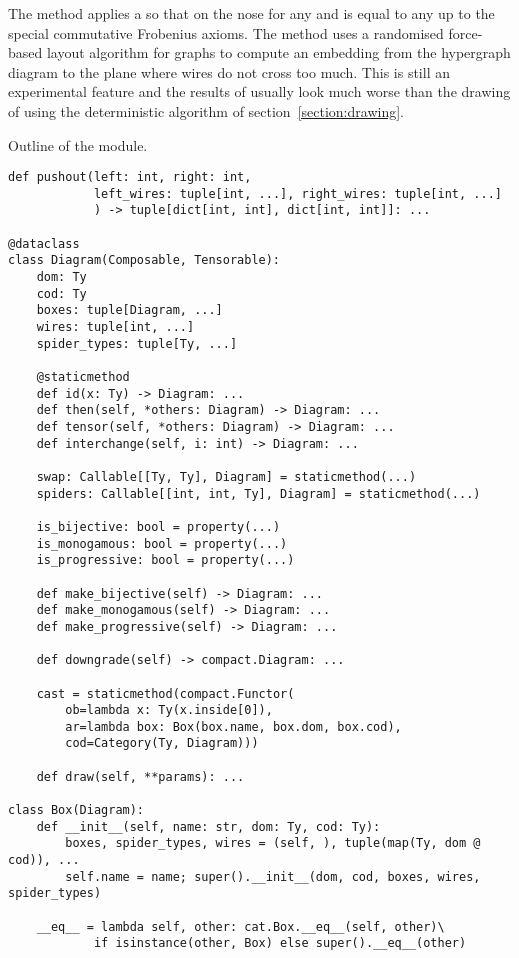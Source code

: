 The method  applies a  so that  on the nose for any  and  is equal to any  up to the special commutative Frobenius axioms.
The  method uses a randomised force-based layout algorithm for graphs to compute an embedding from the hypergraph diagram to the plane where wires do not cross too much.
This is still an experimental feature and the results of  usually look much worse than the drawing of  using the deterministic algorithm of section~\ref{section:drawing}.

\begin{python}\label{listing:discopy-hypergraph}
{\normalfont Outline of the  module.}

\begin{verbatim}
def pushout(left: int, right: int,
            left_wires: tuple[int, ...], right_wires: tuple[int, ...]
            ) -> tuple[dict[int, int], dict[int, int]]: ...

@dataclass
class Diagram(Composable, Tensorable):
    dom: Ty
    cod: Ty
    boxes: tuple[Diagram, ...]
    wires: tuple[int, ...]
    spider_types: tuple[Ty, ...]

    @staticmethod
    def id(x: Ty) -> Diagram: ...
    def then(self, *others: Diagram) -> Diagram: ...
    def tensor(self, *others: Diagram) -> Diagram: ...
    def interchange(self, i: int) -> Diagram: ...

    swap: Callable[[Ty, Ty], Diagram] = staticmethod(...)
    spiders: Callable[[int, int, Ty], Diagram] = staticmethod(...)

    is_bijective: bool = property(...)
    is_monogamous: bool = property(...)
    is_progressive: bool = property(...)

    def make_bijective(self) -> Diagram: ...
    def make_monogamous(self) -> Diagram: ...
    def make_progressive(self) -> Diagram: ...

    def downgrade(self) -> compact.Diagram: ...

    cast = staticmethod(compact.Functor(
        ob=lambda x: Ty(x.inside[0]),
        ar=lambda box: Box(box.name, box.dom, box.cod),
        cod=Category(Ty, Diagram)))

    def draw(self, **params): ...

class Box(Diagram):
    def __init__(self, name: str, dom: Ty, cod: Ty):
        boxes, spider_types, wires = (self, ), tuple(map(Ty, dom @ cod)), ...
        self.name = name; super().__init__(dom, cod, boxes, wires, spider_types)

    __eq__ = lambda self, other: cat.Box.__eq__(self, other)\
            if isinstance(other, Box) else super().__eq__(other)
\end{verbatim}
\end{python}

